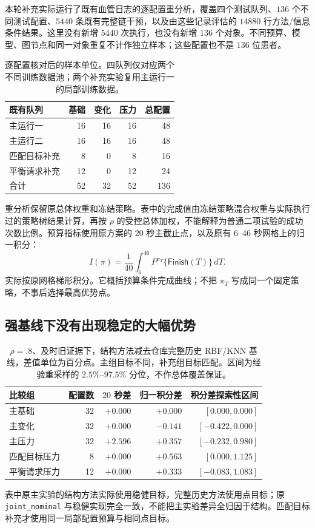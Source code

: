 \documentclass[11pt,a4paper,fontset=fandol]{ctexart}
\theoremstyle{definition}
\theoremstyle{remark}\newtheorem{remark}[theorem]{说明}
\numberwithin{equation}{section}
\newcommand{\Finish}{\mathsf{Finish}}\newcommand{\Win}{\mathsf{Win}}
\begin{document}
本轮补充实际运行了既有血管日志的逐配置重分析，覆盖四个测试队列、$136$ 个不同测试配置、$5440$ 条既有完整链干预，以及由这些记录评估的 $14880$ 行方法/信息条件结果。这里没有新增 $5440$ 次执行，也没有新增 $136$ 个对象。不同预算、模型、图节点和同一对象重复不计作独立样本；这些配置也不是 $136$ 位患者。

\begin{table}[htbp]\centering\small
\begin{tabular}{lrrrr}\toprule
既有队列 & 基础 & 变化 & 压力 & 总配置\\\midrule
主运行一 & 16 & 16 & 16 & 48\\
主运行二 & 16 & 16 & 16 & 48\\
匹配目标补充 & 8 & 0 & 8 & 16\\
平衡请求补充 & 12 & 0 & 12 & 24\\\midrule
合计 & 52 & 32 & 52 & 136\\\bottomrule
\end{tabular}
\caption{逐配置核对后的样本单位。四队列仅对应两个不同训练数据池；两个补充实验复用主运行一的局部训练数据。}
\end{table}

重分析保留原总体权重和冻结策略。表中的完成值由冻结策略混合权重与实际执行过的策略树结果计算，再按 $\rho$ 的受控总体加权，不能解释为普通二项试验的成功次数比例。预算指标使用原方案的 $20$ 秒主截止点，以及原有 $6$--$46$ 秒网格上的归一积分：
\begin{equation}
 I(\pi)=\frac{1}{40}\int_6^{46}
 P^{\pi_T}\{\Finish(T)\}\,dT .
 \label{eq:graph_auc}
\end{equation}
实际按原网格梯形积分。它概括预算条件完成曲线；不把 $\pi_T$ 写成同一个固定策略，不事后选择最高优势点。

\subsection{强基线下没有出现稳定的大幅优势}
\begin{table}[htbp]\centering\small
\begin{tabular}{lrrrr}\toprule
比较组 & 配置数 & $20$ 秒差 & 归一积分差 & 积分差探索性区间\\\midrule
主基础 & 32 & $+0.000$ & $+0.000$ & $[0.000,0.000]$\\
主变化 & 32 & $+0.000$ & $-0.141$ & $[-0.422,0.000]$\\
主压力 & 32 & $+2.596$ & $+0.357$ & $[-0.232,0.980]$\\
匹配目标压力 & 8 & $+0.000$ & $+0.563$ & $[0.000,1.125]$\\
平衡请求压力 & 12 & $+0.000$ & $+0.333$ & $[-0.083,1.083]$\\
\bottomrule\end{tabular}
\caption{$\rho=.8$、及时旧证据下，结构方法减去仓库完整历史 RBF/KNN 基线，差值单位为百分点。主组目标不同，补充组目标匹配。区间为经验重采样的 $2.5\%$--$97.5\%$ 分位，不作总体覆盖保证。}
\label{tab:rean}
\end{table}
表中原主实验的结构方法实际使用稳健目标，完整历史方法使用点目标；原 \texttt{joint\_nominal} 与稳健实现完全一致，不能把主实验差异全归因于结构。匹配目标补充才使用同一局部配置预算与相同点目标。
\end{document}
